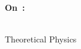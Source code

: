 \pagestyle{empty}
{\raggedleft\vspace*{\baselineskip}
{\LARGE \theauthor}\\[0.35\textheight]
{\HUGE \textcolor{mycolor}{\textbf{On~\thetitle:}}}\\[\baselineskip]
{\LARGE \subt }\\[\baselineskip]
{\large \thedate}\par
\vspace*{2\baselineskip}
\vfill
{\large Theoretical Physics}\par
\vspace*{\baselineskip}}
\clearpage
\pagestyle{headings}
